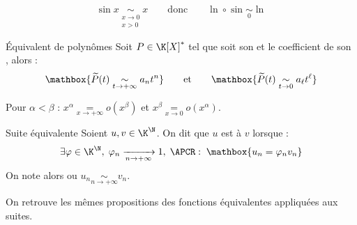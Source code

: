 \documentclass[12pt,a4paper]{report}
\begin{document}
\begin{exemple}
    $$ \sin x \underset{\substack{x \to 0 \\ x > 0}}{\sim} x \qquad \text{donc} \qquad \ln \circ \sin \underset{0}{\sim} \ln $$
\end{exemple}


\begin{proposition}{\'Equivalent de polynômes}{}
    Soit $P \in \K[X]^*$ tel que  soit son  et  le coefficient de son , alors :
    $$ \mathbox{\widetilde{P}(t) \underset{t \to +\infty}{\sim} a_n t^n} \qquad \text{et} \qquad \mathbox{\widetilde{P}(t) \underset{t \to 0}{\sim} a_\ell t^\ell} $$
\end{proposition}

\begin{demo}
    Pour $\alpha < \beta$ : $x^\alpha \underset{x \to +\infty}{=} o\left(x^\beta\right)$ et $x^\beta \underset{x \to 0}{=} o\left(x^\alpha\right)$.
\end{demo}

\begin{definition}{Suite équivalente}{}
    Soient $u, v \in \K^\N$. On dit que $u$ est  à $v$ lorsque :
    $$
    \exists \varphi \in \K^{\N}, \;
    \varphi_n \xrightarrow[n \to +\infty]{} 1, \;
    \APCR : \;
    \mathbox{u_n = \varphi_n v_n}
    $$
    On note alors  ou $u_n \underset{n \to +\infty}{\sim} v_n$.
\end{definition}

\begin{remarque}
    On retrouve les mêmes propositions des fonctions équivalentes appliquées aux suites.
\end{remarque}

\end{document}
